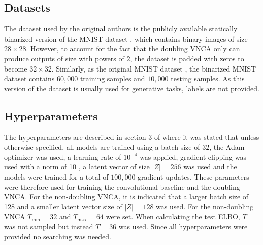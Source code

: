 \subsection{Datasets}
\label{sec:data}

The dataset used by the original authors \cite{palm2022variational} is the publicly available statically binarized version of the MNIST dataset \cite{binarizedMNIST}, which contains binary images of size $28 \times 28$. However, to account for the fact that the doubling VNCA only can produce outputs of size with powers of $2$, the dataset is padded with zeros to become $32 \times 32$. Similarly, as the original MNIST dataset \cite{deng2012mnist}, the binarized MNIST dataset contains $60,000$ training samples and $10,000$ testing samples. As this version of the dataset is usually used for generative tasks, labels are not provided. %

\subsection{Hyperparameters}

The hyperparameters are described in section 3 of \cite{palm2022variational} where it was stated that unless otherwise specified, all models are trained using a batch size of $32$, the Adam optimizer \cite{adam} was used, a learning rate of $10^{-4}$ was applied, gradient clipping was used with a norm of 10 \cite{clipGradient}, a latent vector of size $|Z| = 256$ was used and the models were trained for a total of $100,000$ gradient updates. These parameters were therefore used for training the convolutional baseline and the doubling VNCA. For the non-doubling VNCA, it is indicated that a larger batch size of 128 and a smaller latent vector size of $|Z| = 128$ was used. For the non-doubling VNCA $T_\text{min} = 32$ and $T_\text{max} = 64$ were set. When calculating the test ELBO, $T$ was not sampled but instead $T=36$ was used. Since all hyperparameters were provided no searching was needed.


